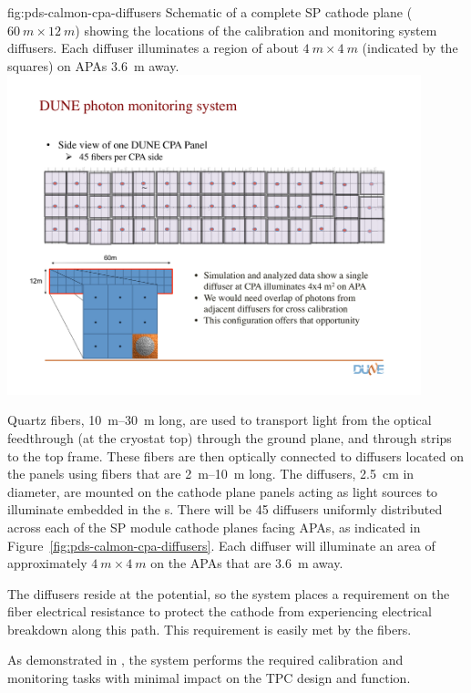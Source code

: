 \begin{dunefigure}
 {fig:pds-calmon-cpa-diffusers}
 {Schematic of a complete SP cathode plane ($\SI{60}{m}\times\SI{12}{m}$) showing the locations of the calibration and monitoring system diffusers. Each diffuser illuminates a region of about $\SI{4}{m}\times\SI{4}{m}$ (indicated by the squares) on APAs \SI{3.6}{m} away.}
\includegraphics[angle=0,width=0.9\textwidth]{graphics/pds-calibration-cpa}
\end{dunefigure}

Quartz fibers, \SIrange{10}{30}{m} long, are used to transport light from the optical feedthrough (at the cryostat top) through the  ground plane, and through  strips to the  top frame. 
These fibers are then optically connected to diffusers located on the  panels using fibers that are \SIrange{2}{10}{m} long. 
The diffusers, \SI{2.5}{cm} in diameter, are mounted on the cathode plane panels acting as light sources to illuminate  embedded in the s. There will be \num{45} diffusers uniformly distributed across each of the SP module cathode planes facing APAs, as indicated in 
Figure~\ref{fig:pds-calmon-cpa-diffusers}. Each diffuser will illuminate an area of approximately $\SI{4}{m}\times\SI{4}{m}$ on the APAs that are \SI{3.6}{m} away. 

The diffusers reside at the  potential, so the  system places a requirement on the fiber electrical resistance to protect the cathode from experiencing electrical breakdown along this path. This requirement is easily met by the fibers. 

As demonstrated in , the system performs the required calibration and monitoring tasks with minimal impact on the TPC design and function. 
